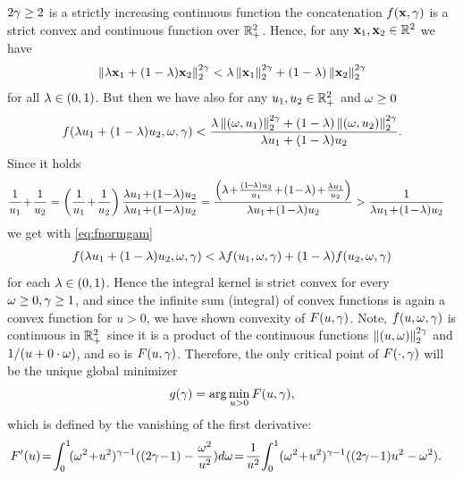 \documentclass[smallabstract,smallcaptions]{dccpaper}
\begin{document}
  $2\gamma\geq2$ is a strictly increasing continuous function the concatenation $f({\mathbf x},\gamma)$ is a strict convex and
  continuous function over ${\mathbb R}_+^2$. Hence, for any ${\mathbf x}_1,{\mathbf x}_2\in{\ensuremath{\mathbb R}}^2$ we have
  \begin{align}
     \left\|\lambda{\ensuremath{\mathbf x}}_1+(1-\lambda){\mathbf x}_2\right\| _2^{2\gamma}<\lambda  \left\|{\mathbf x}_1\right\| _2^{2\gamma} + (1-\lambda) \left\|{\mathbf x}_2\right\| _2^{2\gamma}
  \end{align}
  for all $\lambda\in(0,1)$. But then we have also for any $u_1,u_2\in{\ensuremath{\mathbb R}}^2_+$ and $\omega\geq 0$ 
  \begin{align}
    f(\lambda u_1 +(1-\lambda)u_2,\omega,\gamma) < 
    \frac{\lambda \left\|(\omega,u_1)\right\| _2^{2\gamma} + (1-\lambda) \left\|(\omega,u_2)\right\| _2^{2\gamma}}{\lambda u_1+(1-\lambda)u_2}
    \label{eq:fnormgam}.
  \end{align}
  Since it holds 
  \begin{align}
    \frac{1}{u_1}\! +\!\frac{1}{u_2} &=
       \left(\frac{1}{u_1}\! + \!\frac{1}{u_2}\right)\frac{\lam u_1 \!+\!(1\!-\!\lam)u_2}{\lam u_1 \!+\! (1\!-\!\lam)u_2}
       =\frac{ \left(\lam\! +\!\frac{(1\!-\!\lam)u_2}{u_1}\! +\! (1\!-\!\lam) \!+\! \frac{\lam u_1}{u_2}\right)}{\lam
       u_1 \!+\! (1\!-\!\lam)u_2} 
       > \frac{1}{\lam u_1\! +\! (1\!-\!\lam)u_2}\notag
  \end{align}
  we get with \eqref{eq:fnormgam}
  \begin{align}
    f(\lambda u_1 +(1-\lambda)u_2,\omega,\gamma) < \lambda f(u_1,\omega,\gamma) + (1-\lambda)f(u_2,\omega,\gamma) 
  \end{align}
  for each $\lambda\in(0,1)$. Hence the integral kernel is strict convex for every $\omega\geq0,\gamma\geq 1$, and since the
  infinite sum (integral) of convex functions is again a convex function for $u>0$, we have shown convexity of $F(u,\gamma)$. 
  Note, $f(u,\omega,\gamma)$ is continuous in ${\mathbb R}_+^2$ since it is a product of the continuous functions
  $ \left\|(u,\omega)\right\| _2^{2\gamma}$ and $1/(u+0\cdot\omega)$, and so is $F(u,\gamma)$. 
  Therefore, the only critical point of $F(\cdot,\gamma)$ will be the unique global minimizer
  \begin{align}
    g(\gamma)=\arg\min_{u>0} F(u,\gamma),
  \end{align}
  which is defined by the  vanishing of the first derivative:
  \begin{align}
    F'(u)  &\!= \!\int_0^{1}\! (\ome^2\!+\!u^2)^{\gam-1}( (2\gam\!-\!1)-\frac{\ome^2}{u^2})d\ome
    \!=\!\frac{1}{u^{2}}\!\int_{0}^{1} (\ome^2\!+\!u^2)^{\gam-1}((2\gam\!-\!1)u^2-\ome^2)\label{eq:Fderivative}.
  \end{align}
\end{document}
